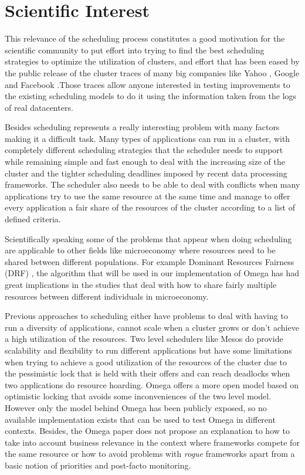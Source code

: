 \documentclass{report}                     %
\begin{document}
\section{Scientific Interest}

This relevance of the scheduling process constitutes a good motivation
for the scientific community to put effort into trying to find the
best scheduling strategies to optimize the utilization of clusters,
and effort that has been eased by the public release of the cluster
traces of many big companies like Yahoo \cite{parashar_10th_2010},
Google \cite{mishra_towards_2010} and Facebook
\cite{Chen:EECS-2012-17} .Those traces allow anyone interested in
testing improvements to the existing scheduling models to do it using
the information taken from the logs of real datacenters.

Besides scheduling represents a really interesting problem with many
factors making it a difficult task. Many types of applications can run
in a cluster, with completely different scheduling strategies that the
scheduler needs to support while remaining simple and fast enough to
deal with the increasing size of the cluster and the tighter
scheduling deadlines imposed by recent data processing frameworks.
The scheduler also needs to be able to deal with conflicts when many
applications try to use the same resource at the same time and manage
to offer every application a fair share of the resources of the
cluster according to a list of defined criteria. 

Scientifically speaking some of the problems that appear when doing
scheduling are applicable to other fields like microeconomy where
resources need to be shared between different populations. For example
Dominant Resources Fairness (DRF) \cite{ghodsi2011dominant} , the
algorithm that will be used in our implementation of Omega has had
great implications in the studies that deal with how to share fairly
multiple resources between different individuals in microeconomy.

Previous approaches to scheduling either have problems to deal with
having to run a diversity of applications, cannot scale when a cluster
grows or don't achieve a high utilization of the resources. Two level
schedulers like Mesos \cite{Hindman10mesos:a} do provide scalability
and flexibility to run different applications but have some
limitations when trying to achieve a good utilization of the resources
of the cluster due to the pessimistic lock that is held with their
offers and can reach deadlocks when two applications do resource
hoarding. Omega \cite{41684} offers a more open model based on
optimistic locking that avoids some inconveniences of the two level
model. However only the model behind Omega has been publicly exposed,
so no available implementation exists that can be used to test Omega
in different contexts. Besides, the Omega paper does not propose an
explanation to how to take into account business relevance in the
context where frameworks compete for the same resource or how to avoid
problems with \emph{rogue} frameworks apart from a basic notion of
priorities and post-facto monitoring.
\end{document}
